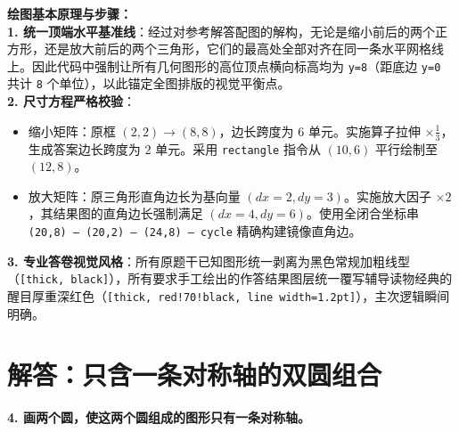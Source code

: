 \documentclass[12pt, a4paper]{ctexrep}
\begin{document}
\vspace{0.6cm}

{\small\color{blue!70!black}
\textbf{绘图基本原理与步骤：}\\
\textbf{1. 统一顶端水平基准线}：经过对参考解答配图的解构，无论是缩小前后的两个正方形，还是放大前后的两个三角形，它们的最高处全部对齐在同一条水平网格线上。因此代码中强制让所有几何图形的高位顶点横向标高均为 \texttt{y=8}（距底边 \texttt{y=0} 共计 \texttt{8} 个单位），以此锚定全图排版的视觉平衡点。\\
\textbf{2. 尺寸方程严格校验}：
   \begin{itemize}
       \item 缩小矩阵：原框 $(2,2) \to (8,8)$，边长跨度为 $6$ 单元。实施算子拉伸 $\times \frac{1}{3}$，生成答案边长跨度为 $2$ 单元。采用 \texttt{rectangle} 指令从 $(10,6)$ 平行绘制至 $(12,8)$。
       \item 放大矩阵：原三角形直角边长为基向量 $(dx=2, dy=3)$。实施放大因子 $\times 2$，其结果图的直角边长强制满足 $(dx=4, dy=6)$。使用全闭合坐标串 \texttt{(20,8) -- (20,2) -- (24,8) -- cycle} 精确构建镜像直角边。
   \end{itemize}
\textbf{3. 专业答卷视觉风格}：所有原题干已知图形统一剥离为黑色常规加粗线型（\texttt{[thick, black]}），所有要求手工绘出的作答结果图层统一覆写辅导读物经典的醒目厚重深红色（\texttt{[thick, red!70!black, line width=1.2pt]}），主次逻辑瞬间明确。
}

\vspace{0.8cm}
\vspace{0.8cm}

\section{解答：只含一条对称轴的双圆组合}

\vspace{0.4cm}

\noindent\textbf{4. 画两个圆，使这两个圆组成的图形只有一条对称轴。}

\vspace{1.2cm}
\end{document}
